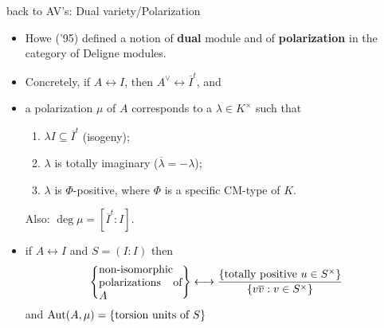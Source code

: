 \documentclass{beamer}
\begin{document}
\begin{frame}{ back to AV's: Dual variety/Polarization }
\begin{itemize}
 \item Howe ('95) defined a notion of \textbf{dual} module and of \textbf{polarization} in the category of Deligne modules.
\pause \item Concretely, if $A\leftrightarrow I$, then $A^\vee \leftrightarrow \overline{I}^t$, and
\pause \item a polarization $\mu$ of $A$ corresponds to a $\lambda\in K^\times$ such that
      \begin{enumerate}[-]
       \item $\lambda I \subseteq \overline{I}^t$ (isogeny);
       \item $\lambda$ is totally imaginary ($\overline \lambda = -\lambda$);
       \item $\lambda$ is $\Phi$-positive, where $\Phi$ is a specific CM-type of $K$.
      \end{enumerate} 
      Also: $\deg \mu= [\overline{I}^t : I]$.
\pause  \item if $A \leftrightarrow I$ and $S=(I:I)$ then
  \[\set{\parbox[p]{7.5em}{non-isomorphic polarizations of $A$}} \longleftrightarrow \dfrac{\set{\text{totally positive }u\in S^\times }}{\set{v\overline{v}: v\in S^\times}}\]
  and $\operatorname{Aut}(A,\mu) = \left\lbrace\text{torsion units of $S$}\right\rbrace$
\end{itemize}
\end{frame}

%  
%  
%  
\end{document}
